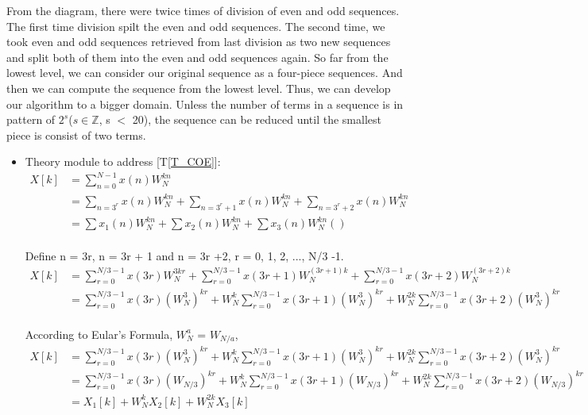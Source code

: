 \documentclass[12pt]{article}
\newcommand{\tref}[1]{T\ref{#1}}
\begin{document}
\begin{itemize}
From the diagram, there were twice times of division of even and odd sequences. The first time division spilt the even and odd sequences. The second time, we took even and odd sequences retrieved from last division as two new sequences and split both of them into the even and odd sequences again. So far from the lowest level, we can consider our original sequence as a four-piece sequences. And then we can compute the sequence from the lowest level. Thus, we can develop our algorithm to a bigger domain. Unless the number of terms
in a sequence is in pattern of  $2^s$($s\in\mathbb{Z}$, s $<$ 20), the sequence can be reduced until the smallest piece is consist of two terms.

\end{itemize}

\begin{itemize}
\item Theory module to address [\tref{T_COE}]:\\

\begin{align*}
X[k] &= \sum\limits_{n=0}^{N-1}x(n)W_{N}^{kn}\\
& = \sum\limits_{n = 3^r}x(n)W_{N}^{kn} + \sum\limits_{n = 3^r+1}x(n)W_{N}^{kn} + \sum\limits_{n = 3^r+2}x(n)W_{N}^{kn}\\
& = \sum\limits x_1(n)W_{N}^{kn} + \sum\limits x_2(n)W_{N}^{kn} + \sum\limits x_3(n)W_{N}^{kn}  ()\\
\end{align*}


Define n = 3r, n = 3r + 1 and n = 3r +2, r = 0, 1, 2, ..., N/3 -1.\\

\begin{align*}
X[k] &= \sum\limits_{r=0}^{N/3 -1}x(3r)W_{N}^{3kr} + \sum\limits_{r=0}^{N/3 -1}x(3r+1)W_{N}^{(3r+ 1)k} + \sum\limits_{r=0}^{N/3 -1}x(3r+2)W_{N}^{(3r+ 2)k}\\
& =  \sum\limits_{r=0}^{N/3 -1}x(3r)(W_{N}^{3})^{kr} + W_{N}^{k}\sum\limits_{r=0}^{N/3 -1}x(3r+1)(W_{N}^{3})^{kr} + W_{N}^{2k}\sum\limits_{r=0}^{N/3 -1}x(3r+2)(W_{N}^{3})^{kr}\\
\end{align*}

According to Eular's Formula, $W_{N}^{a}$ = $W_{N/a}$,\\

\begin{align*}
X[k] & =  \sum\limits_{r=0}^{N/3 -1}x(3r)(W_{N}^{3})^{kr} + W_{N}^{k}\sum\limits_{r=0}^{N/3 -1}x(3r+1)(W_{N}^{3})^{kr} + W_{N}^{2k}\sum\limits_{r=0}^{N/3 -1}x(3r+2)(W_{N}^{3})^{kr}\\
& = \sum\limits_{r=0}^{N/3 -1}x(3r)(W_{N/3})^{kr} + W_{N}^{k}\sum\limits_{r=0}^{N/3 -1}x(3r+1)(W_{N/3})^{kr} + W_{N}^{2k}\sum\limits_{r=0}^{N/3 -1}x(3r+2)(W_{N/3})^{kr}\\
& = X_1[k] + W_N^kX_2[k] + W_N^{2k}X_3[k]\\
\end{align*}


\end{itemize}
\end{document}
